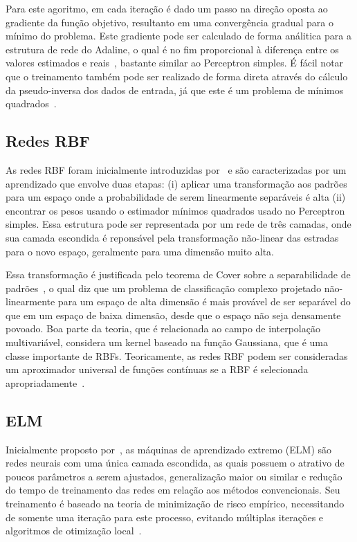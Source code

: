 \documentclass[conference]{IEEEtran}
\begin{document}
	Para este agoritmo, em cada iteração é dado um passo na direção oposta ao gradiente da função objetivo, resultanto em uma convergência gradual para o mínimo do problema. Este gradiente pode ser calculado de forma análitica para a estrutura de rede do Adaline, o qual é no fim proporcional à diferença entre os valores estimados e reais~\cite{widrow1960adaptive}, bastante similar ao Perceptron simples. É fácil notar que o treinamento também pode ser realizado de forma direta através do cálculo da pseudo-inversa dos dados de entrada, já que este é um problema de mínimos quadrados~\cite{haykin2007neural}.
	
	\subsection{Redes RBF}
	As redes RBF foram inicialmente introduzidas por~\cite{broomhead1988multivariablefi} e são caracterizadas por um aprendizado que envolve duas etapas: (i) aplicar uma transformação aos padrões para um espaço onde a probabilidade de serem linearmente separáveis é alta (ii) encontrar os pesos usando o estimador mínimos quadrados usado no Perceptron simples. Essa estrutura pode ser representada por um rede de três camadas, onde sua camada escondida é reponsável pela transformação não-linear das estradas para o novo espaço, geralmente para uma dimensão muito alta. 
	
	Essa transformação é justificada pelo teorema de Cover sobre a separabilidade de padrões~\cite{cover1965geometrical}, o qual diz que um problema de classificação complexo projetado não-linearmente para um espaço de alta dimensão é mais provável de ser separável do que em um espaço de baixa dimensão, desde que o espaço não seja densamente povoado. Boa parte da teoria, que é relacionada ao campo de interpolação multivariável, considera um kernel baseado na função Gaussiana, que é uma classe importante de RBFs. Teoricamente, as redes RBF podem ser consideradas um aproximador universal de funções contínuas se a RBF é selecionada apropriadamente~\cite{poggio1990networks, park1991universal, liao2003relaxed}.
	
	\subsection{ELM}	
	Inicialmente proposto por~\cite{huang2004extreme}, as máquinas de aprendizado extremo (ELM) são redes neurais com uma única camada escondida, as quais possuem o atrativo de poucos parâmetros a serem ajustados, generalização maior ou similar e redução do tempo de treinamento das redes em relação aos métodos convencionais. Seu treinamento é baseado na teoria de minimização de risco empírico, necessitando de somente uma iteração para este processo, evitando múltiplas iterações e algoritmos de otimização local~\cite{ding2015extreme}. 
	
\end{document}
